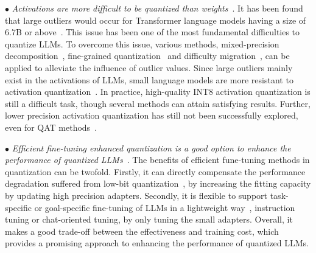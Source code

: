 $\bullet$ \emph{Activations are more difficult to be quantized than weights}~\cite{Yao-CoRR-2023-ZeroQuant-V2,Dettmers-arxiv-2022-LLM,Xiao-CoRR-2022-SmoothQuant}. It has been found that large outliers would occur for Transformer language models having a size of 6.7B or above~\cite{Dettmers-arxiv-2022-LLM}. This issue has been one of the most fundamental difficulties to quantize LLMs.  
To overcome this issue, various methods, \eg mixed-precision decomposition~\cite{Dettmers-arxiv-2022-LLM}, fine-grained  quantization~\cite{wei-arxiv-2023-zero,Dettmers-arxiv-2022-LLM} and difficulty migration~\cite{Xiao-CoRR-2022-SmoothQuant},   can be applied to alleviate the influence of outlier values. 
Since large outliers mainly exist in the activations of LLMs, small language models are more resistant to activation quantization~\cite{Yao-CoRR-2023-ZeroQuant-V2,Liu-2023-arxiv-Do_emergent}.  %
{In practice, high-quality INT8 activation quantization is still a difficult task, though several methods can attain satisfying results. }
Further, lower precision activation quantization has still not been successfully explored, even for QAT methods~\cite{liu-2023-arxiv-LLM-QAT}.  

{
$\bullet$ \emph{Efficient fine-tuning enhanced quantization is a good option to enhance the performance of quantized LLMs}~\cite{Dettmers-CoRR-2023-QLoRA,Hu-ICLR-2022-LoRA}.  
The benefits of efficient fune-tuning methods in quantization can be twofold. Firstly, it can directly compensate the performance degradation suffered from low-bit quantization~\cite{Yao-CoRR-2023-ZeroQuant-V2,Liu-2023-arxiv-Do_emergent}, by 
increasing the fitting capacity by updating high precision adapters. Secondly, it is flexible to support  task-specific or goal-specific fine-tuning of LLMs in a lightweight way~\cite{Dettmers-CoRR-2023-QLoRA}, \eg instruction tuning or chat-oriented tuning, by only tuning the small adapters. Overall, it makes a good trade-off between the effectiveness and training cost, which provides a promising approach to enhancing the performance of quantized LLMs.   
}
















